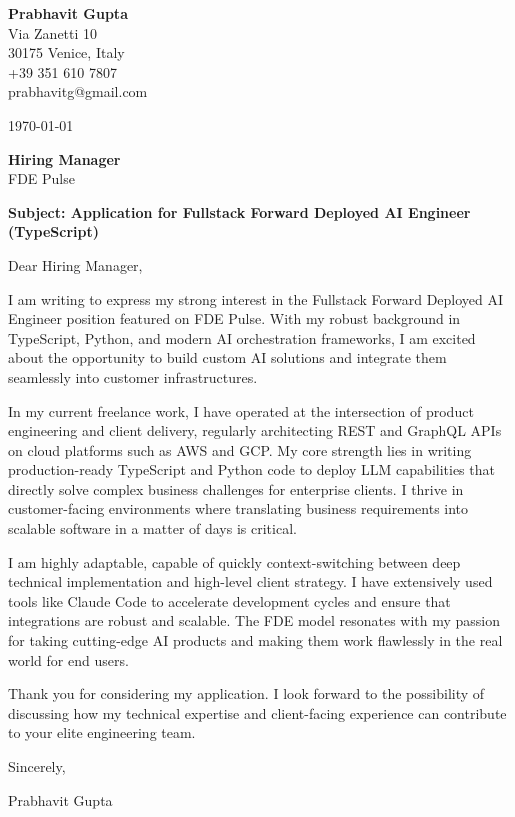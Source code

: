 \documentclass[11pt,a4paper]{article}
\begin{document}
\begin{flushleft}
\textbf{Prabhavit Gupta}\\
Via Zanetti 10\\
30175 Venice, Italy\\
+39 351 610 7807\\
prabhavitg@gmail.com
\end{flushleft}

\vspace{2em}

\begin{flushleft}
\today
\end{flushleft}

\vspace{2em}

\begin{flushleft}
\textbf{Hiring Manager}\\
FDE Pulse\\
\end{flushleft}

\vspace{1em}

\textbf{Subject: Application for Fullstack Forward Deployed AI Engineer (TypeScript)}

\vspace{1em}

Dear Hiring Manager,

I am writing to express my strong interest in the Fullstack Forward Deployed AI Engineer position featured on FDE Pulse. With my robust background in TypeScript, Python, and modern AI orchestration frameworks, I am excited about the opportunity to build custom AI solutions and integrate them seamlessly into customer infrastructures.

In my current freelance work, I have operated at the intersection of product engineering and client delivery, regularly architecting REST and GraphQL APIs on cloud platforms such as AWS and GCP. My core strength lies in writing production-ready TypeScript and Python code to deploy LLM capabilities that directly solve complex business challenges for enterprise clients. I thrive in customer-facing environments where translating business requirements into scalable software in a matter of days is critical.

I am highly adaptable, capable of quickly context-switching between deep technical implementation and high-level client strategy. I have extensively used tools like Claude Code to accelerate development cycles and ensure that integrations are robust and scalable. The FDE model resonates with my passion for taking cutting-edge AI products and making them work flawlessly in the real world for end users.

Thank you for considering my application. I look forward to the possibility of discussing how my technical expertise and client-facing experience can contribute to your elite engineering team.

Sincerely,

\vspace{1em}
Prabhavit Gupta
\end{document}
